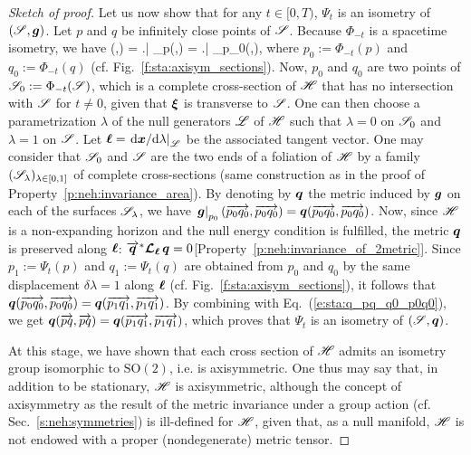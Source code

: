 \begin{proof}[Sketch of proof]
Let us now show that for any $t\in[0,T)$, %
$\Psi_t$ is an isometry of $(\mathscr{S},\bm{g})$.
Let $p$ and $q$ be infinitely close points of $\mathscr{S}$. Because $\Phi_{-t}$ is
a spacetime isometry, we have
\be \label{e:sta:q_pq_q0_p0q0}
 (,) = \left.\right| _p(,)
= \left.\right| _{p_0}(,),
\ee
where $p_0 := \Phi_{-t}(p)$ and $q_0 := \Phi_{-t}(q)$ (cf. Fig.~\ref{f:sta:axisym_sections}).
Now, $p_0$ and $q_0$ are two points of $\mathscr{S}_0 := \Phi_{-t}(\mathscr{S})$, which
is a complete cross-section of $\mathscr{H}$ that has no intersection with $\mathscr{S}$ for $t\neq 0$, given that $\bm{\xi}$ is transverse to $\mathscr{S}$. One can then
choose a parametrization $\lambda$ of the null generators $\mathscr{L}$ of $\mathscr{H}$
such that $\lambda=0$ on $\mathscr{S}_0$ and $\lambda=1$ on $\mathscr{S}$. Let
$\bm{\ell} = \left. \mathrm{d}\bm{x}/\mathrm{d}\lambda \right| _{\mathscr{L}}$ be the associated tangent vector.
One may consider that $\mathscr{S}_0$ and $\mathscr{S}$ are the two ends of a foliation of $\mathscr{H}$
by a family $(\mathscr{S}_\lambda)_{\lambda\in[0,1]}$ of complete cross-sections
(same construction as in the proof of Property~\ref{p:neh:invariance_area}).
By denoting by $\bm{q}$ the metric induced by $\bm{g}$ on each of the surfaces
$\mathscr{S}_\lambda$, we have $\left.\bm{g}\right| _{p_0}(\overrightarrow{p_0q_0},\overrightarrow{p_0q_0}) = \bm{q}(\overrightarrow{p_0q_0},\overrightarrow{p_0q_0})$. Now, since $\mathscr{H}$ is a non-expanding horizon and the null
energy condition is fulfilled, the metric $\bm{q}$ is preserved along $\bm{\ell}$: $\overrightarrow{\bm{q}}^* \bm{\mathcal{L}}_{\bm{\ell}}\, \bm{q} = 0$[Property~\ref{p:neh:invariance_of_2metric}]. Since $p_1:= \Psi_t(p)$ and $q_1:=\Psi_t(q)$
are obtained from $p_0$ and $q_0$ by the same displacement $\delta\lambda=1$
along $\bm{\ell}$ (cf. Fig.~\ref{f:sta:axisym_sections}),
it follows that $\bm{q}(\overrightarrow{p_0q_0},\overrightarrow{p_0q_0}) =  \bm{q}(\overrightarrow{p_1 q_1},\overrightarrow{p_1 q_1})$.
By combining with Eq.~(\ref{e:sta:q_pq_q0_p0q0}), we get
$\bm{q}(\overrightarrow{pq},\overrightarrow{pq}) = \bm{q}(\overrightarrow{p_1q_1},\overrightarrow{p_1q_1})$, which proves that
$\Psi_t$ is an isometry of $(\mathscr{S}, \bm{q})$.

At this stage, we have shown that each cross section of $\mathscr{H}$ admits an
isometry group isomorphic to $\mathrm{SO}(2)$, i.e. is axisymmetric.
One thus may say that, in addition to be stationary,
$\mathscr{H}$ is axisymmetric, although the concept of axisymmetry as the result of the
metric invariance under a group action (cf. Sec.~\ref{s:neh:symmetries})
is ill-defined for $\mathscr{H}$, given that, as a null manifold, $\mathscr{H}$
is not endowed with a proper (nondegenerate) metric tensor.


\end{proof}
